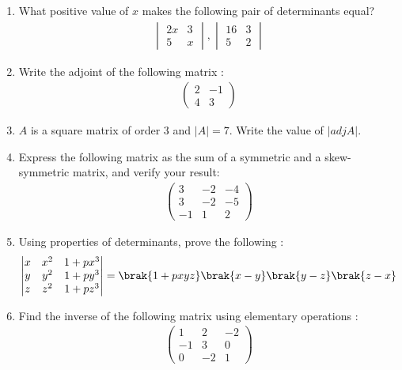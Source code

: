 \begin{enumerate}

\item What positive value of $x$ makes the following pair of determinants equal?
    \begin{align*}
    \begin{vmatrix}
    2x & 3 \\
    5 & x
    \end{vmatrix}
    ,
    \begin{vmatrix}
    16 & 3 \\
    5 & 2
    \end{vmatrix}
    \end{align*}

\item Write the adjoint of the following matrix :
    \begin{align*}
    \begin{pmatrix}
    2 & -1 \\
    4 & 3
    \end{pmatrix}
    \end{align*}

\item $A$ is a square matrix of order 3 and $ \lvert A \rvert = 7$. Write the value of $\lvert adj A \rvert$.

\item Express the following matrix as the sum of a symmetric and a skew-symmetric matrix, and verify your result:
    \begin{align*}
    \begin{pmatrix}
        3 & -2 & -4 \\
        3 & -2 & -5 \\
        -1 & 1 & 2
    \end{pmatrix}
    \end{align*}

    \item Using properties of determinants, prove the following :
    \begin{align*}
    \begin{vmatrix}
        x & x^2 & 1 + px^3 \\
        y & y^2 & 1 + py^3 \\
        z & z^2 & 1 + pz^3
    \end{vmatrix}
    = \brak{1 + pxyz} \brak{x - y} \brak{y - z} \brak{z - x}
    \end{align*}

\item Find the inverse of the following matrix using elementary operations :
    \begin{align*}
    \begin{pmatrix}
        1 & 2 & -2 \\
        -1 & 3 & 0 \\
        0 & -2 & 1
    \end{pmatrix}
    \end{align*}

\end{enumerate}